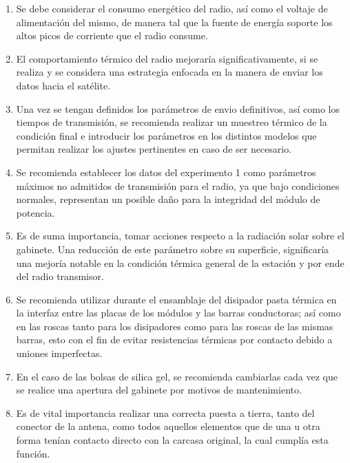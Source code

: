 \begin{enumerate}
    \item Se debe considerar el consumo energético del radio, así como el voltaje de alimentación del mismo, de manera tal que la fuente de energía soporte los altos picos de corriente que el radio consume.
    \item El comportamiento térmico del radio mejoraría significativamente, si se realiza y se considera una estrategia enfocada en la manera de enviar los datos hacia el satélite.
    \item Una vez se tengan definidos los parámetros de envio definitivos, así como los tiempos de transmisión, se recomienda realizar un muestreo térmico de la condición final e introducir los parámetros en los distintos modelos que permitan realizar los ajustes pertinentes en caso de ser necesario.
    \item Se recomienda establecer los datos del experimento 1 como parámetros máximos no admitidos de transmisión para el radio, ya que bajo condiciones normales, representan un posible daño para la integridad del módulo de potencia.
    \item Es de suma importancia, tomar acciones respecto a la radiación solar sobre el gabinete. Una reducción de este parámetro sobre su superficie, significaría una mejoría notable en la condición térmica general de la estación y por ende del radio transmisor.
    \item Se recomienda utilizar durante el ensamblaje del disipador pasta térmica en la interfaz entre  las placas de los módulos y las barras conductoras; así como en las roscas tanto para los disipadores como para las roscas de las mismas barras, esto con el fin de evitar resistencias térmicas por contacto debido a uniones imperfectas.
    \item En el caso de las bolsas de silica gel, se recomienda cambiarlas cada vez que se realice una apertura del gabinete por motivos de mantenimiento.
    \item Es de vital importancia realizar una correcta puesta a tierra, tanto del conector de la antena, como todos aquellos elementos que de una u otra forma tenían contacto directo con la carcasa original, la cual cumplía esta función. 
\end{enumerate}
